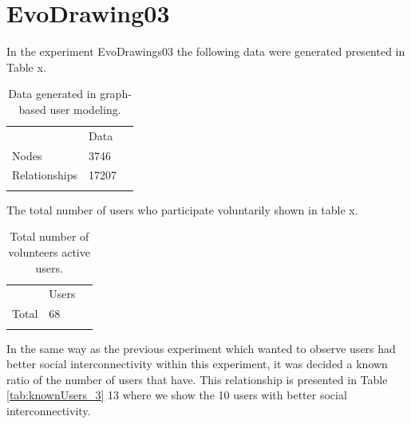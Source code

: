 \section{EvoDrawing03}
In the experiment EvoDrawings03 the following data were generated presented in Table x.

\begin{table}
\small
\caption{Data generated in graph-based user modeling.}
\label{tab:dataGenerated_3} 
\centering
\small
\begin{tabular}{p{3cm} p{3cm} p{3cm} }
\hline\noalign{\smallskip}
  & Data &  \\
\noalign{\smallskip}\hline\noalign{\smallskip}
\small{Nodes} & \small{3746 } & \\ \hline  
\small{Relationships} & \small{17207 } & \\ \hline  
  
\noalign{\smallskip}\hline
\end{tabular}
\end{table}

The total number of users who participate voluntarily shown in table x.

\begin{table}
\small
\caption{Total number of volunteers active users.}
\label{tab:totalUsers_3} 
\centering
\small
\begin{tabular}{p{3cm} p{3cm} p{3cm} }
\hline\noalign{\smallskip}
  & Users &  \\
\noalign{\smallskip}\hline\noalign{\smallskip}
\small{Total } & \small{68} & \\ \hline    
\noalign{\smallskip}\hline
\end{tabular}
\end{table}

In the same way as the previous experiment which wanted to observe users had
better social interconnectivity within this experiment, it was decided a known
ratio of the number of users that have. This relationship is presented in Table \ref{tab:knownUsers_3}
13 where we show the 10 users with better social interconnectivity.

